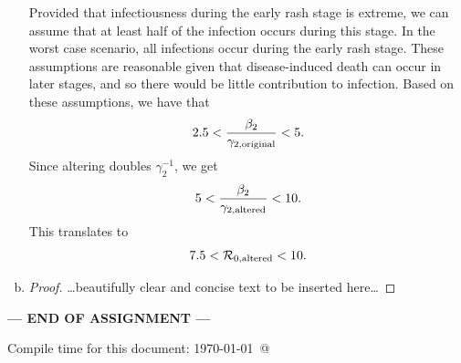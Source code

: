 \documentclass[12pt]{article}\usepackage[]{graphicx}\usepackage[]{color}
\newcommand{\BeautifulSolution}{{\color{blue}\begin{proof}{\color{magenta}\dots beautifully clear and concise text to be inserted here\dots}\end{proof}}}
\begin{document}
\begin{enumerate}[(a)]
{{Provided that infectiousness during the early rash stage is extreme, we can assume that at least half of the infection occurs during this stage. In the worst case scenario, all infections occur during the early rash stage. These assumptions are reasonable given that disease-induced death can occur in later stages, and so there would be little contribution to infection.
Based on these assumptions, we have that
$$
2.5 < \frac{\beta_2}{\gamma_{2,\tiny{\textrm{original}}}} < 5.
$$
Since altering doubles $\gamma_2^{-1}$, we get
$$
5 < \frac{\beta_2}{\gamma_{2,\tiny{\textrm{altered}}}} < 10.
$$
This translates to
$$
7.5 < {\cal R}_{0, \tiny{\textrm{altered}}} <10.
$$
}}
  \item \qRe

    \BeautifulSolution

\end{enumerate}

\smpxnathistfig

\bigskip
\centerline{\bf--- END OF ASSIGNMENT ---}

\bigskip
Compile time for this document:
\today\ @ \thistime
\end{document}
